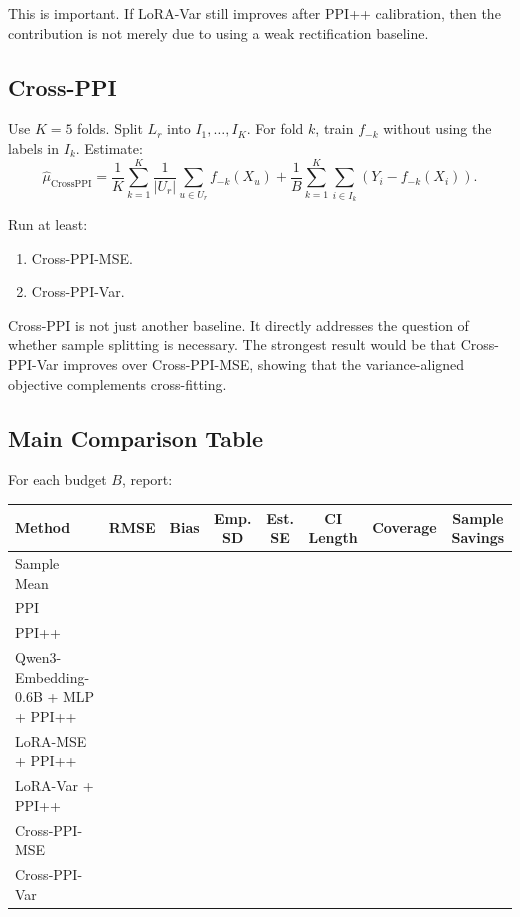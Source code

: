 \documentclass[11pt]{article}
\begin{document}
This is important. If LoRA-Var still improves after PPI++ calibration, then the contribution is not merely due to using a weak rectification baseline.

\subsection{Cross-PPI}

Use $K=5$ folds. Split $L_r$ into $I_1,\ldots,I_K$. For fold $k$, train $f_{-k}$ without using the labels in $I_k$. Estimate:
\[
\hat\mu_{\mathrm{CrossPPI}}
=
\frac{1}{K}\sum_{k=1}^{K}\frac{1}{|U_r|}\sum_{u\in U_r} f_{-k}(X_u)
+
\frac{1}{B}\sum_{k=1}^{K}\sum_{i\in I_k}\left(Y_i-f_{-k}(X_i)\right).
\]

Run at least:

\begin{enumerate}
    \item Cross-PPI-MSE.
    \item Cross-PPI-Var.
\end{enumerate}

Cross-PPI is not just another baseline. It directly addresses the question of whether sample splitting is necessary. The strongest result would be that Cross-PPI-Var improves over Cross-PPI-MSE, showing that the variance-aligned objective complements cross-fitting.

\subsection{Main Comparison Table}

For each budget $B$, report:

{\small
\setlength{\tabcolsep}{3pt}
\begin{longtable}{@{}p{}ccccccc@{}}
\toprule
Method & RMSE & Bias & Emp. SD & Est. SE & CI Length & Coverage & Sample Savings \\
\midrule
Sample Mean &  &  &  &  &  &  &  \\
PPI &  &  &  &  &  &  &  \\
PPI++ &  &  &  &  &  &  &  \\
Qwen3-Embedding-0.6B + MLP + PPI++ &  &  &  &  &  &  &  \\
LoRA-MSE + PPI++ &  &  &  &  &  &  &  \\
LoRA-Var + PPI++ &  &  &  &  &  &  &  \\
Cross-PPI-MSE &  &  &  &  &  &  &  \\
Cross-PPI-Var &  &  &  &  &  &  &  \\
\bottomrule
\end{longtable}
}
\end{document}
